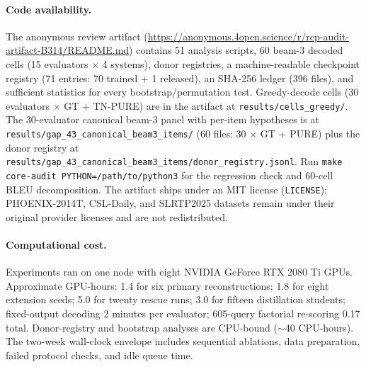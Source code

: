 \documentclass[pdflatex,sn-chicago]{sn-jnl}
\begin{document}
\paragraph{Code availability.} The anonymous review artifact (\url{https://anonymous.4open.science/r/rcp-audit-artifact-B314/README.md}) contains 51 analysis scripts, 60 beam-3 decoded cells (15 evaluators $\times$ 4 systems), donor registries, a machine-readable checkpoint registry (71 entries: 70 trained + 1 released), an SHA-256 ledger (396 files), and sufficient statistics for every bootstrap/permutation test. Greedy-decode cells (30 evaluators $\times$ GT + TN-PURE) are in the artifact at \texttt{results/cells\_greedy/}. The 30-evaluator canonical beam-3 panel with per-item hypotheses is at \texttt{results/gap\_43\_canonical\_beam3\_items/} (60 files: 30 $\times$ GT + PURE) plus the donor registry at \texttt{results/gap\_43\_canonical\_beam3\_items/donor\_registry.jsonl}. Run \texttt{make core-audit PYTHON=/path/to/python3} for the regression check and 60-cell BLEU decomposition. The artifact ships under an MIT license (\texttt{LICENSE}); PHOENIX-2014T, CSL-Daily, and SLRTP2025 datasets remain under their original provider licenses and are not redistributed.

\paragraph{Computational cost.} Experiments ran on one node with eight NVIDIA GeForce RTX 2080 Ti GPUs. Approximate GPU-hours: 1.4 for six primary reconstructions; 1.8 for eight extension seeds; 5.0 for twenty rescue runs; 3.0 for fifteen distillation students; fixed-output decoding 2 minutes per evaluator; 605-query factorial re-scoring 0.17 total. Donor-registry and bootstrap analyses are CPU-bound ($\sim$40 CPU-hours). The two-week wall-clock envelope includes sequential ablations, data preparation, failed protocol checks, and idle queue time.


\end{document}
